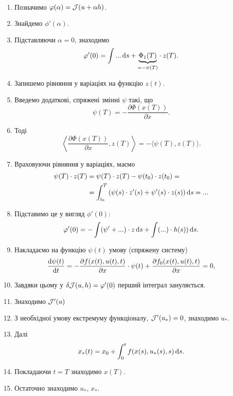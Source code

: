 \begin{algorithm} \tt
	\begin{enumerate}
	\item Позначимо $\varphi (\alpha) = \mathcal{J} (u + \alpha h)$. 

	\item Знайдемо $\phi' (\alpha)$.

	\item Підставляючи $\alpha = 0$, знаходимо \[\varphi' (0) = \int ... \mathop{}\!\mathrm{d} s + \underset{=-\psi(T)}{\underbrace{\Phi_1(T)}} \cdot z (T). \]

	\item Запишемо рівняння у варіаціях на функцію $z(t)$.

	\item Введемо додаткові, спряжені змінні $\psi$ такі, що \[ \psi (T) = - \frac{\partial \Phi (x (T))}{\partial x}. \] 

	\item Тоді \[\left\langle \frac{\partial \Phi (x (T))}{\partial x}, z (T) \right\rangle = - \langle \psi (T), z (T) \rangle.\] 

	\item Враховуючи рівняння у варіаціях, маємо
	\begin{align*}
		\psi (T) \cdot z (T) &= \psi (T) \cdot z (T) - \psi (t_0) \cdot z (t_0) = \\
		&= \int_{t_0}^T \left( \psi (s) \cdot z' (s) + \psi' (s) \cdot z (s) \right) \mathop{}\!\mathrm{d} s = ...
	\end{align*}

	\item Підставимо це у вигляд $\phi' (0)$:
	\[ \varphi' (0) = - \int (\psi' + ...) \cdot z \mathop{}\!\mathrm{d} s + \int (...) \cdot h(s)) \mathop{}\!\mathrm{d} s.\]

	\item Накладаємо на функцію $\psi(t)$ умову (спряжену систему) \[ \frac{\mathop{}\!\mathrm{d} \psi (t)}{\mathop{}\!\mathrm{d} t} = - \frac{\partial f (x (t), u (t), t)}{\partial x} \cdot \psi (t) + \frac{\partial f_0 (x (t), u (t), t)}{\partial x} = 0, \]

	\item Завдяки цьому у $\delta \mathcal{J} (u, h) = \varphi' (0)$ перший інтеграл зануляється. \\

	\item Знаходимо $\mathcal{J} ' (u)$

	\item З необхідної умову екстремуму функціоналу, $\mathcal{J}' (u_*) = 0$, зна\-хо\-ди\-мо $u_*$.

	\item Далі \[x_*(t) = x_0 + \int_0^t f(x(s), u_*(s), s) \mathop{}\!\mathrm{d} s.\]

	\item Покладаючи $t = T$ знаходимо $x (T)$.

	\item Остаточно знаходимо $u_*$, $x_*$.
	\end{enumerate}
\end{algorithm}

